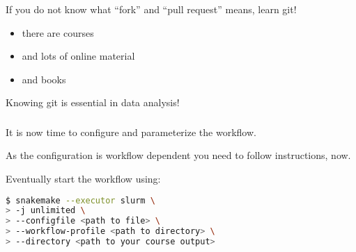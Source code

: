 \begin{frame}
  \frametitle{}
  If you do not know what ``fork'' and ``pull request'' means, learn git!
  \begin{itemize}[<+->]
   \item there are courses
   \item and lots of online material
   \item and books
  \end{itemize}
  \pause
  \begin{warning}
  	Knowing git is essential in data analysis!
  \end{warning}
\end{frame}

\begin{frame}[fragile]
  \frametitle{}
  It is now time to configure and parameterize the workflow.
  \pause
  \begin{hint}
  	As the configuration is workflow dependent you need to follow instructions, now.
  \end{hint}
  \pause
  Eventually start the workflow using:
  \begin{lstlisting}[language=Bash, style=Shell]
$ snakemake --executor slurm \
> -j unlimited \
> --configfile <path to file> \
> --workflow-profile <path to directory> \
> --directory <path to your course output>
  \end{lstlisting}
\end{frame}

